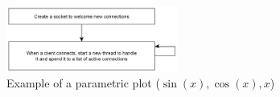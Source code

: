 \documentclass{article}
\begin{document}








%

\begin{figure}[h]
\caption{Example of a parametric plot ($\sin (x), \cos(x), x$)}
\centering
\includegraphics[width=0.5\textwidth]{media/serverFlowchart2.png}
\end{figure}
\end{document}
